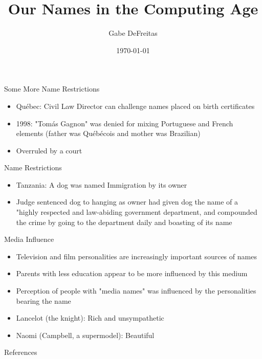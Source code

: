 \documentclass{beamer}
\title{Our Names in the Computing Age}
\date{\today}
\author{Gabe DeFreitas}
\begin{document}
\maketitle

\begin{frame}{Some More Name Restrictions}
\begin{itemize}
  \item Québec: Civil Law Director can challenge names placed on birth
  certificates
  \item 1998: "Tomás Gagnon" was denied for mixing Portuguese and French
  elements (father was Québécois and mother was Brazilian)
  \item Overruled by a court
\end{itemize}
\end{frame}

\begin{frame}{Name Restrictions}
\begin{itemize}
\item Tanzania: A dog was named Immigration by its owner
\item Judge sentenced dog to hanging as owner had given dog the name of a
"highly respected and law-abiding government department, and compounded
the crime by going to the department daily and boasting of its name
\end{itemize}
\end{frame}

\begin{frame}{Media Influence}
\begin{itemize}
\item Television and film personalities are increasingly important sources
of names
\item Parents with less education appear to be more influenced by this
medium
\item Perception of people with "media names" was influenced by the
personalities bearing the name 
\item Lancelot (the knight): Rich and unsympathetic
\item Naomi (Campbell, a supermodel): Beautiful
\end{itemize}
\end{frame}

\begin{frame}[allowframebreaks]{References}
\printbibliography
\end{frame}
\end{document}
